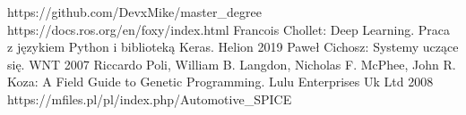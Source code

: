\documentclass[12pt,twoside]{article}
\begin{document}
\clearpage


\begin{thebibliography}{6}
 https://github.com/DevxMike/master\_degree
 https://docs.ros.org/en/foxy/index.html
 Francois Chollet: Deep Learning. Praca z językiem Python i biblioteką Keras. Helion 2019
 Paweł Cichosz: Systemy uczące się. WNT 2007 
  Riccardo Poli, William B. Langdon, Nicholas F. McPhee, John R. Koza: A Field Guide to Genetic Programming. Lulu Enterprises Uk Ltd 2008
 https://mfiles.pl/pl/index.php/Automotive\_SPICE
\end{thebibliography}

\clearpage

\makesummary
\end{document}
